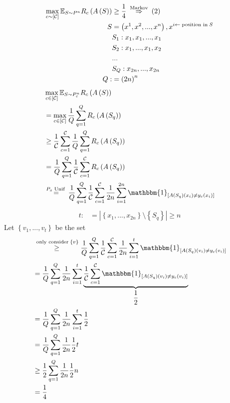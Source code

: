 \documentclass{article}
\begin{document}
\begin{align*}
\displaystyle\max_{c \sim  \left[\mathcal{C}\right]} \mathbb{E}_{S \sim  P^{n}} R_{c}\left(A\left(S\right)\right) &\geq  \dfrac{1}{4} \stackrel{\text{\;Markov\;}}{\Rightarrow} \left(2\right)
\\ S  &= \left(x^{1}, x^{2}, ..., x^{n}\right), x^{i \leftarrow \text{\;position in\;} S}
\\ &S_{1}: x_{1}, x_{1}, ..., x_{1}
\\ &S_{2}: x_{1}, ..., x_{1}, x_{2}
\\ &...
\\ &S_{Q}: x_{2n}, ..., x_{2n}
\\ Q  :&= \left(2 n\right)^{n}
\end{align*}
\begin{align*}
&  \displaystyle\max_{c \in \left[\mathcal{C}\right]} \mathbb{E}_{S \sim  P_{c}^{n}} R_{c}\left(A\left(S\right)\right)
\\ &= \displaystyle\max_{c \in \left[\mathcal{C}\right]} \dfrac{1}{Q} \displaystyle\sum_{q=1}^{Q} R_{c}\left(A\left(S_{q}\right)\right)
\\ &\geq  \dfrac{1}{\mathcal{C}} \displaystyle\sum_{c=1}^{\mathcal{C}} \dfrac{1}{Q} \displaystyle\sum_{q=1}^{Q} R_{c}\left(A\left(S_{q}\right)\right)
\\ &= \dfrac{1}{Q} \displaystyle\sum_{q=1}^{Q} \dfrac{1}{\mathcal{C}} \displaystyle\sum_{c=1}^{\mathcal{C}} R_{c}\left(A\left(S_{q}\right)\right)
\\ &\stackrel{P_{x} \text{\;Unif\;}}{=} \dfrac{1}{Q} \displaystyle\sum_{q=1}^{Q} \dfrac{1}{\mathcal{C}} \displaystyle\sum_{c=1}^{\mathcal{C}} \dfrac{1}{2n} \displaystyle\sum_{i=1}^{2n} \mathbbm{1}_{\left[A\left(S_{q}\right)\left(x_{i}\right) \neq  y_{c}\left(x_{i}\right)\right]}
\end{align*}
\begin{align*}
t  :&= \left|  \left\{x_{1}, ..., x_{2n}\right\} \setminus  \left\{S_{q}\right\}  \right| \geq  n 
\end{align*}
Let $\left\{v_{1}, ..., v_{t}\right\}$ be the set
\newline \newline
\begin{align*}
&\stackrel{\text{\;only consider\;} \left\{v \right\}}{\geq} \dfrac{1}{Q} \displaystyle\sum_{q=1}^{Q} \dfrac{1}{\mathcal{C}} \displaystyle\sum_{c=1}^{\mathcal{C}} \dfrac{1}{2n} \displaystyle\sum_{i=1}^{t} \mathbbm{1}_{\left[A\left(S_{q}\right)\left(v_{i}\right) \neq  y_{c}\left(v_{i}\right)\right]}
\\ &= \dfrac{1}{Q} \displaystyle\sum_{q=1}^{Q} \dfrac{1}{2n} \displaystyle\sum_{i=1}^{t} \underbrace{ \dfrac{1}{\mathcal{C}} \displaystyle\sum_{c=1}^{\mathcal{C}} \mathbbm{1}_{\left[A\left(S_{q}\right)\left(v_{i}\right) \neq  y_{c}\left(v_{i}\right)\right]} }_{\dfrac{1}{2}}
\\ &= \dfrac{1}{Q} \displaystyle\sum_{q=1}^{Q} \dfrac{1}{2n} \displaystyle\sum_{i=1}^{t} \dfrac{1}{2}
\\ &= \dfrac{1}{Q} \displaystyle\sum_{q=1}^{Q} \dfrac{1}{2n} \dfrac{1}{2} t
\\ &\geq  \dfrac{1}{2} \displaystyle\sum_{q=1}^{Q} \dfrac{1}{2n} \dfrac{1}{2} n
\\ &= \dfrac{1}{4}
\end{align*}
\end{document}
